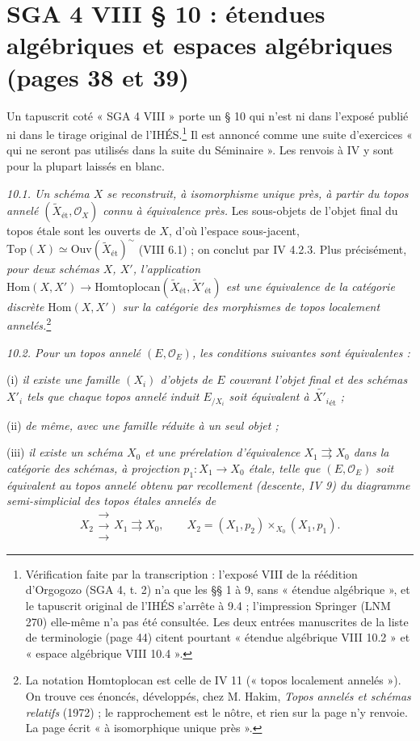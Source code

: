 \documentclass[11pt,a4paper]{article}
\begin{document}
\section*{SGA 4 VIII § 10 : étendues algébriques et espaces algébriques (pages 38 et 39)}

Un tapuscrit coté « SGA 4 VIII » porte un § 10 qui n'est ni dans l'exposé
publié ni dans le tirage original de l'IHÉS.\footnote{Vérification faite par
la transcription : l'exposé VIII de la réédition d'Orgogozo (SGA 4, t. 2)
n'a que les §§ 1 à 9, sans « étendue algébrique », et le tapuscrit original
de l'IHÉS s'arrête à 9.4 ; l'impression Springer (LNM 270) elle-même n'a pas
été consultée. Les deux entrées manuscrites de la liste de terminologie (page 44) citent
pourtant « étendue algébrique VIII 10.2 » et « espace algébrique VIII 10.4 ».}
Il est annoncé comme une suite d'exercices « qui ne seront pas utilisés dans
la suite du Séminaire ». Les renvois à IV y sont pour la plupart laissés en
blanc.

\emph{10.1. Un schéma $X$ se reconstruit, à isomorphisme unique près, à partir
du topos annelé $(\widetilde{X}_{\text{ét}}, \mathcal{O}_X)$ connu à
équivalence près.} Les sous-objets de l'objet final du topos étale sont les
ouverts de $X$, d'où l'espace sous-jacent, $\mathrm{Top}(X) \simeq
\mathrm{Ouv}(\widetilde{X}_{\text{ét}})^{\sim}$ (VIII 6.1) ; on conclut par IV
4.2.3. Plus précisément, \emph{pour deux schémas $X$, $X'$, l'application
$\mathrm{Hom}(X, X') \to \mathrm{Homtoplocan}(\widetilde{X}_{\text{ét}},
\widetilde{X}'_{\text{ét}})$ est une équivalence de la catégorie discrète
$\mathrm{Hom}(X, X')$ sur la catégorie des morphismes de topos localement
annelés.}\footnote{La notation $\mathrm{Homtoplocan}$ est celle de IV 11
(« topos localement annelés »). On trouve ces énoncés, développés, chez M.
Hakim, \emph{Topos annelés et schémas relatifs} (1972) ; le rapprochement est
le nôtre, et rien sur la page n'y renvoie. La page écrit « à isomorphique
unique près ».}

\emph{10.2. Pour un topos annelé $(E, \mathcal{O}_E)$, les conditions suivantes
sont équivalentes :}

(i) \emph{il existe une famille $(X_i)$ d'objets de $E$ couvrant l'objet
final et des schémas $X'_i$ tels que chaque topos annelé induit $E_{/X_i}$
soit équivalent à $\widetilde{X'_i}_{\text{ét}}$ ;}

(ii) \emph{de même, avec une famille réduite à un seul objet ;}

(iii) \emph{il existe un schéma $X_0$ et une prérelation d'équivalence
$X_1 \rightrightarrows X_0$ dans la catégorie des schémas, à projection
$p_1 : X_1 \to X_0$ étale, telle que $(E, \mathcal{O}_E)$ soit équivalent au
topos annelé obtenu par recollement (descente, IV 9) du diagramme
semi-simplicial des topos étales annelés de}
\[
X_2 \mathrel{\substack{\longrightarrow\\[-2pt] \longrightarrow\\[-2pt] \longrightarrow}} X_1 \rightrightarrows X_0 ,
\qquad X_2 = (X_1, p_2) \times_{X_0} (X_1, p_1) .
\]
\end{document}
